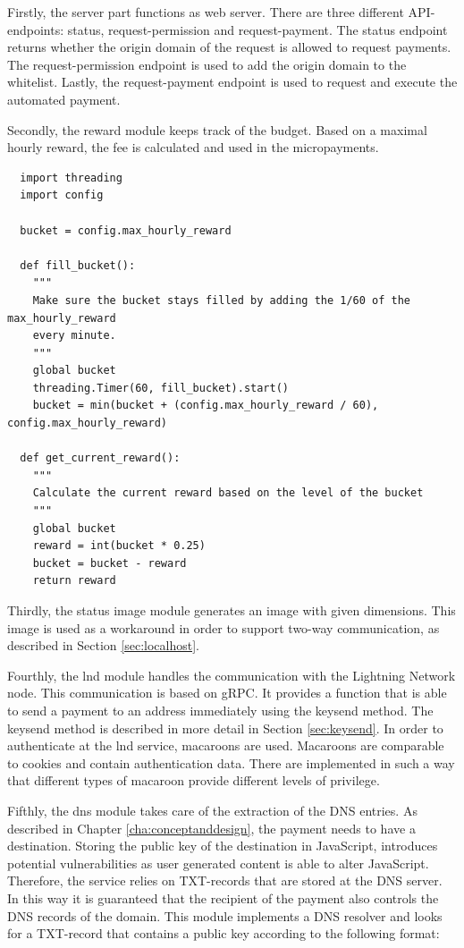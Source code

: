 Firstly, the server part functions as web server. There are three different API-endpoints: status, request-permission and request-payment. The status endpoint returns whether the origin domain of the request is allowed to request payments. The request-permission endpoint is used to add the origin domain to the whitelist. Lastly, the request-payment endpoint is used to request and execute the automated payment.

Secondly, the reward module keeps track of the budget. Based on a maximal hourly reward, the fee is calculated and used in the micropayments.


\lstset{language=Python}
\lstset{frame=lines}
\lstset{basicstyle=\footnotesize}
\begin{lstlisting}
  import threading
  import config
  
  bucket = config.max_hourly_reward
  
  def fill_bucket():
    """
    Make sure the bucket stays filled by adding the 1/60 of the max_hourly_reward
    every minute.
    """
    global bucket
    threading.Timer(60, fill_bucket).start()
    bucket = min(bucket + (config.max_hourly_reward / 60), config.max_hourly_reward)
  
  def get_current_reward():
    """
    Calculate the current reward based on the level of the bucket
    """
    global bucket
    reward = int(bucket * 0.25)
    bucket = bucket - reward
    return reward
\end{lstlisting}

Thirdly, the status image module generates an image with given dimensions. This image is used as a workaround in order to support two-way communication, as described in Section \ref{sec:localhost}.

Fourthly, the lnd module handles the communication with the Lightning Network node. This communication is based on gRPC. It provides a function that is able to send a payment to an address immediately using the keysend method. The keysend method is described in more detail in Section \ref{sec:keysend}. In order to authenticate at the lnd service, macaroons are used. Macaroons are comparable to cookies and contain authentication data. There are implemented in such a way that different types of macaroon provide different levels of privilege. 

Fifthly, the dns module takes care of the extraction of the DNS entries. As described in Chapter \ref{cha:conceptanddesign}, the payment needs to have a destination. Storing the public key of the destination in JavaScript, introduces potential vulnerabilities as user generated content is able to alter JavaScript. Therefore, the service relies on TXT-records that are stored at the DNS server. In this way it is guaranteed that the recipient of the payment also controls the DNS records of the domain. This module implements a DNS resolver and looks for a TXT-record that contains a public key according to the following format:

